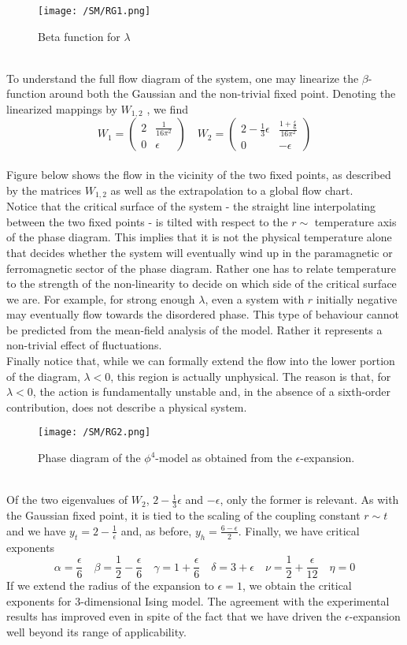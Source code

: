 \begin{figure}[!h]
\centering
\texttt{[image: /SM/RG1.png]}
\caption{Beta function for $\lambda$}
\end{figure}
\\
To understand the full flow diagram of the system, one may linearize the $\beta$-function around both the Gaussian and the non-trivial fixed point. Denoting the linearized mappings by $W_{1,2}$ , we find
\[W_1 = \begin{pmatrix} 2 & \frac{1}{16\pi^2} \\ 0 & \epsilon \end{pmatrix} \quad W_2 = \begin{pmatrix} 2 - \frac{1}{3}\epsilon & \frac{1+ \frac{\epsilon}{6}}{16\pi^2}\\  0 & -\epsilon \end{pmatrix} \]
\\
Figure below shows the flow in the vicinity of the two fixed points, as described by the matrices $W_{1,2}$ as well as the extrapolation to a global flow chart.
\\
Notice that the critical surface of the system - the straight line interpolating between the two fixed points - is tilted with respect to the $r \sim$ temperature axis of the phase diagram. 
This implies that it is not the physical temperature alone that decides whether the system will eventually wind up in the paramagnetic or ferromagnetic sector of the phase diagram. 
Rather one has to relate temperature to the strength of the non-linearity to decide on which side of the critical surface we are. 
For example, for strong enough $\lambda$, even a system with $r$ initially negative may eventually flow towards the disordered phase. This type of behaviour cannot be predicted from the mean-field analysis of the model. Rather it represents a non-trivial effect of fluctuations.
\\
Finally notice that, while we can formally extend the flow into the lower portion of the diagram, $\lambda < 0$, this region is actually unphysical. The reason is that, for $\lambda < 0$, the action is fundamentally unstable and, in the absence of a sixth-order contribution, does not describe
a physical system.
\begin{figure}[!h]
\centering
\texttt{[image: /SM/RG2.png]}
\caption{Phase diagram of the $\phi^4$-model as obtained from the $\epsilon$-expansion.}
\end{figure}
\\
Of the two eigenvalues of $W_2$, $2 - \frac{1}{3}\epsilon$ and $-\epsilon$, only the former is relevant. As with the Gaussian fixed point, it is tied to the scaling of the coupling constant $r \sim t$ and we have $y_t = 2 - \frac{1}{\epsilon}$ and, as before, $y_h = \frac{6-\epsilon}{2}$. Finally, we have critical exponents
\[\alpha = \frac{\epsilon}{6} \quad \beta = \frac{1}{2} - \frac{\epsilon}{6} \quad \gamma = 1 + \frac{\epsilon}{6} \quad \delta = 3 + \epsilon \quad \nu = \frac{1}{2} + \frac{\epsilon}{12} \quad \eta = 0\]
If we extend the radius of the expansion to $\epsilon = 1$,
we obtain the critical exponents for 3-dimensional Ising model. The agreement with the experimental results has improved even in spite of the fact that we have driven the $\epsilon$-expansion well beyond its range of applicability.
